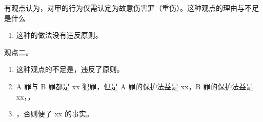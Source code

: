 \begin{enumerate}
\begin{kk}{有观点认为，对甲的行为仅需认定为故意伤害罪（重伤）。这种观点的理由与不足是什么}
\begin{enumerate}
            \item 这种的做法没有违反原则。
          \end{enumerate}
          \tcblower
          观点二。
          \begin{enumerate}
            \item 这种观点的不足是，违反了原则。
            \item A 罪与 B 罪都是 xx 犯罪，但是 A 罪的保护法益是 xx，B 罪的保护法益是 xx，，
            \item {}，否则便了 xx 的事实。
          \end{enumerate}
        \end{kk}
\end{enumerate}
